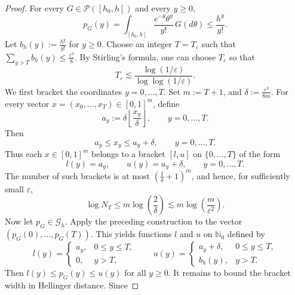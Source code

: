 \documentclass[twoside,12pt]{article}
\begin{document}
\begin{proof}
For every $G\in\mathcal P([h_{0},h])$ and every $y\ge 0$,
\begin{displaymath}
p_G(y)=\int_{[h_{0},h]}\frac{e^{-\theta}\theta^y}{y!}\,G(d\theta)\le\frac{h^y}{y!}.
\end{displaymath}
Let $b_h(y):=\frac{h^y}{y!}$ for $y\ge 0$. Choose an integer $T=T_\varepsilon$ such that $\sum_{y>T} b_h(y)\le \frac{\varepsilon^2}{8}$. By Stirling's formula, one can choose $T_\varepsilon$ so that
\begin{displaymath}
T_\varepsilon
\lesssim
\frac{\log(1/\varepsilon)}{\log\log(1/\varepsilon)}.
\end{displaymath}
We first bracket the coordinates $y=0,\dots,T$. Set $m:=T+1$, and $\delta:=\frac{\varepsilon^2}{8m}$. For every vector $x=(x_0,\dots,x_T)\in[0,1]^m$, define
\begin{displaymath}
a_y:=\delta\left\lfloor \frac{x_y}{\delta}\right\rfloor,
\qquad y=0,\dots,T.
\end{displaymath}
Then
\begin{displaymath}
a_y\le x_y\le a_y+\delta,\qquad y=0,\dots,T.
\end{displaymath}
Thus each $x\in[0,1]^m$ belongs to a bracket $[l,u]$ on $\{0,\dots,T\}$ of the form
\begin{displaymath}
l(y)=a_y,\qquad u(y)=a_y+\delta,\qquad y=0,\dots,T.
\end{displaymath}
The number of such brackets is at most $\left(\frac{1}{\delta}+1\right)^m$, and hence, for sufficiently small $\varepsilon$,
\begin{displaymath}
\log N_T\le m\log\left(\frac{2}{\delta}\right)\lesssim m\log\left(\frac{m}{\varepsilon^2}\right).
\end{displaymath}
Now let $p_G\in\mathcal G_h$. Apply the preceding construction to the vector $(p_G(0),\dots,p_G(T))$. This yields functions $l$ and $u$ on $\mathbb N_0$ defined by
\begin{displaymath}
l(y)=
\begin{cases}
a_y, & 0\le y\le T,\\
0, & y>T,
\end{cases}
\qquad
u(y)=
\begin{cases}
a_y+\delta, & 0\le y\le T,\\
b_h(y), & y>T.
\end{cases}
\end{displaymath}
Then $l(y)\le p_G(y)\le u(y)$ for all $y\ge 0$. It remains to bound the bracket width in Hellinger distance. Since

\end{proof}
\end{document}
